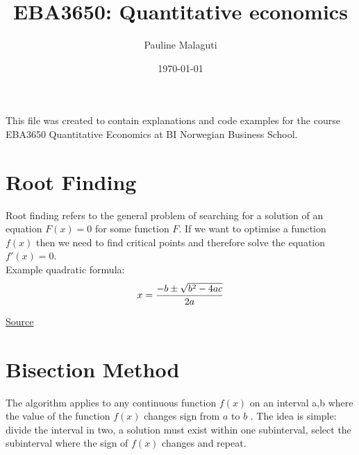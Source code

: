 \documentclass[a4paper, 12pt, reqno]{article}
\title{EBA3650: Quantitative economics}
\date{\today}
\author{Pauline Malaguti}
\begin{document}
\maketitle

This file was created to contain explanations and code examples for the course EBA3650 Quantitative Economics at BI Norwegian Business School.

\tableofcontents

\newpage
\section{Root Finding}
Root finding refers to the general problem of searching for a solution of an equation $F(x) = 0$  for some function $F$.  
If we want to optimise a function $f(x)$ then we need to find critical points and therefore solve the equation  $f'(x)= 0$. \\
Example quadratic formula: \\
\begin{equation}
x = \frac{-b \pm \sqrt{b^2 - 4ac}}{2a}
\notag
\end{equation}

\href{https://personal.math.ubc.ca/~pwalls/math-python/roots-optimization/root-finding/}{Source}

\section{Bisection Method}
The algorithm applies to any continuous function $f(x)$ on an interval a,b where the value of the function $f(x)$ changes sign from $a$ to $b$ . The idea is simple: divide the interval in two, a solution must exist within one subinterval, select the subinterval where the sign of $f(x)$ changes and repeat. \\
\end{document}
